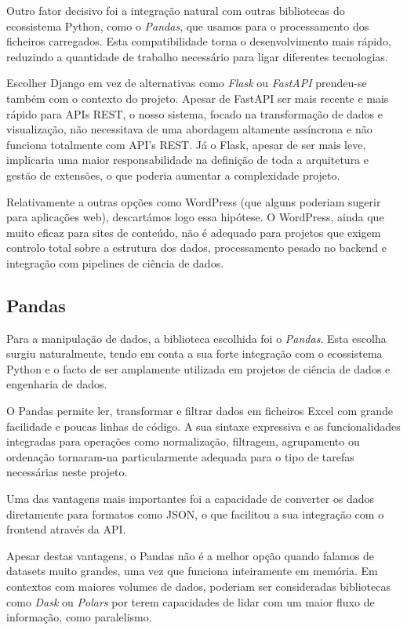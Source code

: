 Outro fator decisivo foi a integração natural com outras bibliotecas do ecossistema Python, como o \textit{Pandas}, que usamos para o processamento dos ficheiros carregados. Esta compatibilidade torna o desenvolvimento mais rápido, reduzindo a quantidade de trabalho necessário para ligar diferentes tecnologias.

Escolher Django em vez de alternativas como \textit{Flask} ou \textit{FastAPI} prendeu-se também com o contexto do projeto. Apesar de FastAPI ser mais recente e mais rápido para APIs REST, o nosso sistema, focado na transformação de dados e visualização, não necessitava de uma abordagem altamente assíncrona e não funciona totalmente com API's REST. Já o Flask, apesar de ser mais leve, implicaria uma maior responsabilidade na definição de toda a arquitetura e gestão de extensões, o que poderia aumentar a complexidade projeto.

Relativamente a outras opções como WordPress (que alguns poderiam sugerir para aplicações web), descartámos logo essa hipótese. O WordPress, ainda que muito eficaz para sites de conteúdo, não é adequado para projetos que exigem controlo total sobre a estrutura dos dados, processamento pesado no backend e integração com pipelines de ciência de dados.


\subsection{Pandas}

Para a manipulação de dados, a biblioteca escolhida foi o \textit{Pandas}. Esta escolha surgiu naturalmente, tendo em conta a sua forte integração com o ecossistema Python e o facto de ser amplamente utilizada em projetos de ciência de dados e engenharia de dados.

O Pandas permite ler, transformar e filtrar dados em ficheiros Excel com grande facilidade e poucas linhas de código. A sua sintaxe expressiva e as funcionalidades integradas para operações como normalização, filtragem, agrupamento ou ordenação tornaram-na particularmente adequada para o tipo de tarefas necessárias neste projeto.

Uma das vantagens mais importantes foi a capacidade de converter os dados diretamente para formatos como JSON, o que facilitou a sua integração com o frontend através da API.

Apesar destas vantagens, o Pandas não é a melhor opção quando falamos de datasets muito grandes, uma vez que funciona inteiramente em memória. Em contextos com maiores volumes de dados, poderiam ser consideradas bibliotecas como \textit{Dask} ou \textit{Polars} por terem capacidades de lidar com um maior fluxo de informação, como paralelismo.

